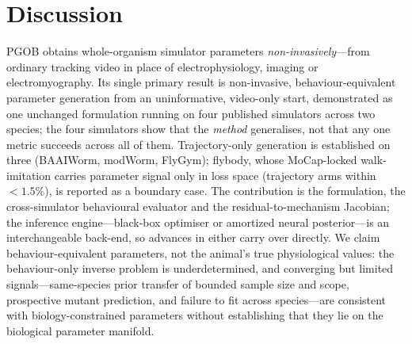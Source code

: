 \documentclass[11pt]{article}
\begin{document}
\section*{Discussion}
PGOB obtains whole-organism simulator parameters \emph{non-invasively}---from ordinary tracking video in place of electrophysiology, imaging or electromyography. Its single primary result is non-invasive, behaviour-equivalent parameter generation from an uninformative, video-only start, demonstrated as one unchanged formulation running on four published simulators across two species; the four simulators show that the \emph{method} generalises, not that any one metric succeeds across all of them. Trajectory-only generation is established on three (BAAIWorm, modWorm, FlyGym); flybody, whose MoCap-locked walk-imitation carries parameter signal only in loss space (trajectory arms within ${<}1.5\%$), is reported as a boundary case. The contribution is the formulation, the cross-simulator behavioural evaluator and the residual-to-mechanism Jacobian; the inference engine---black-box optimiser or amortized neural posterior---is an interchangeable back-end, so advances in either carry over directly. We claim behaviour-equivalent parameters, not the animal's true physiological values: the behaviour-only inverse problem is underdetermined, and converging but limited signals---same-species prior transfer of bounded sample size and scope, prospective mutant prediction, and failure to fit across species---are consistent with biology-constrained parameters without establishing that they lie on the biological parameter manifold.
\end{document}
